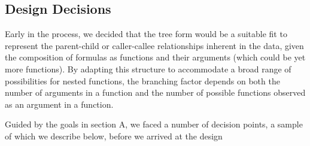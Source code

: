 \documentclass[conference]{IEEEtran}
\begin{document}
	\subsection{Design Decisions} Early in the process, we decided that the tree
	form would be a suitable fit to represent the parent-child or caller-callee
	relationships inherent in the data, given the composition of formulas as
	functions and their arguments (which could be yet more functions). By adapting
	this structure to accommodate a broad range of possibilities for nested
	functions, the branching factor depends on both the number of arguments in a
	function and the number of possible functions observed as an argument in a
	function. \par Guided by the goals in section A, we faced a number of decision
	points, a sample of which we describe below, before we arrived at the design
\end{document}
